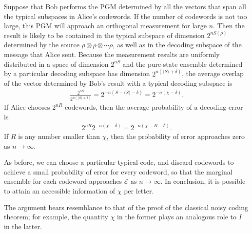 \documentclass[a4paper, 12pt]{article}
\numberwithin{equation}{section}
\numberwithin{figure}{section}
\theoremstyle{definition}
\begin{document}
    Suppose that Bob performs the PGM determined by all the vectors that span all the typical subspaces in Alice's codewords. If the number of codewords is not too large, this PGM will approach an orthogonal measurement for large $n$. Then the result is likely to be contained in the typical subspace of dimension $2^{n S(\rho)}$ determined by the source $\rho \otimes \rho \otimes \cdots \rho$, as well as in the decoding subspace of the message that Alice sent. Because the measurement results are uniformly distributed in a space of dimension $2^{nS}$ and the pure-state ensemble determined by a particular decoding subspace has dimension $2^{n(\langle S \rangle + \delta)}$, the average overlap of the vector determined by Bob's result with a typical decoding subspace is
    \begin{align}
        \frac{2^{nS}}{2^{n(\langle S \rangle + \delta)}} = 2^{-n(S - \langle S \rangle - \delta)} = 2^{-n(\chi - \delta)}.
    \end{align}
    If Alice chooses $2^{nR}$ codewords, then the average probability of a decoding error is
    \begin{align}
        2^{nR} 2^{-n(\chi - \delta)} = 2^{-n(\chi - R - \delta)}.
    \end{align}
    If $R$ is any number smaller than $\chi$, then the probability of error approaches zero as $n \to \infty$. \par
    As before, we can choose a particular typical code, and discard codewords to achieve a small probability of error for every codeword, so that the marginal ensemble for each codeword approaches $\mathcal{E}$ as $n \to \infty$. In conclusion, it is possible to attain an accessible information of $\chi$ per letter. \par
    The argument bears resemblance to that of the proof of the classical noisy coding theorem; for example, the quantity $\chi$ in the former plays an analogous role to $I$ in the latter.
\end{document}
